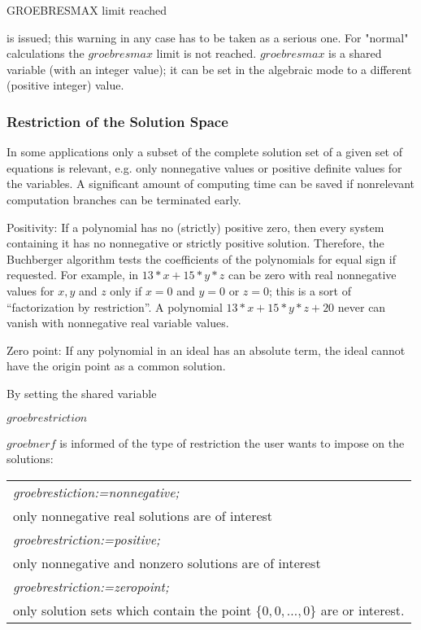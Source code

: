 GROEBRESMAX limit reached

is issued; this warning in any case has to be taken as a serious one.
For "normal" calculations the $groebresmax$ limit is not reached.
$groebresmax$ is a shared variable (with an integer value); it can be
set in the algebraic mode to a different (positive integer) value.

\subsubsection{Restriction of the Solution Space}
In some applications only a subset of the complete solution set
of a given set of equations is relevant, e.g. only
nonnegative values or positive definite values for the variables.
A significant amount of computing time can be saved if
nonrelevant computation branches can be terminated early.

Positivity: If a polynomial has no (strictly) positive zero, then
every system containing it has no nonnegative or strictly positive
solution. Therefore, the Buchberger algorithm tests the coefficients of
the polynomials for equal sign if requested. For example, in $13*x +
15*y*z $ can be zero with real nonnegative values for $x, y$ and $z$
only if $x=0$ and $y=0$ or $ z=0$; this is a sort of ``factorization by
restriction''. A polynomial $13*x + 15*y*z + 20$ never can vanish
with nonnegative real variable values.

Zero point:  If any polynomial in an ideal has an absolute term, the ideal
cannot have the origin point as a common solution.

By setting the shared variable
\begin{center} $groebrestriction$ \end{center}
$groebnerf$ is informed of the type of restriction the user wants to
impose on the solutions:
\begin{center}
\begin{tabular}{l}
{\it groebrestiction:=nonnegative;} \\
\hspace*{+.5cm} only nonnegative real solutions are of
interest\vspace*{4mm} \\
{\it groebrestriction:=positive;} \\
\hspace*{+.5cm}only nonnegative and nonzero solutions are of
interest\vspace*{4mm} \\
{\it groebrestriction:=zeropoint;} \\
\hspace*{+.5cm}only solution sets which contain the point
$\{0,0,\ldots,0\}$ are or interest.
\end{tabular}
\end{center}


